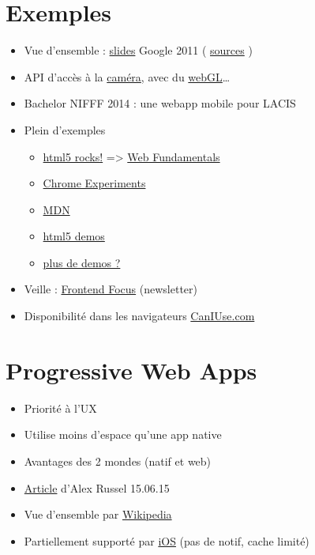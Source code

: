 \hypertarget{exemples}{%
\section{Exemples}\label{exemples}}

\begin{itemize}
\tightlist
\item
  Vue d'ensemble :
  \href{http://web.archive.org/web/20150525080904/http://slides.html5rocks.com/\#landing-slide}{slides}
  Google 2011 (
  \href{https://github.com/html5rocks/slides.html5rocks.com}{sources} )
\item
  API d'accès à la
  \href{http://www.soundstep.com/blog/experiments/jsdetection/}{caméra},
  avec du
  \href{http://auduno.github.io/clmtrackr/examples/facesubstitution.html}{webGL}\ldots{}
\item
  Bachelor NIFFF 2014 : une webapp mobile pour LACIS
\item
  Plein d'exemples

  \begin{itemize}
  \tightlist
  \item
    \href{http://www.html5rocks.com/}{html5 rocks!} =\textgreater{}
    \href{https://developers.google.com/web/}{Web Fundamentals}
  \item
    \href{http://www.chromeexperiments.com/}{Chrome Experiments}
  \item
    \href{https://developer.mozilla.org/en-US/demos/tag/tech:html5}{MDN}
  \item
    \href{http://html5demos.com/}{html5 demos}
  \item
    \href{http://bit.ly/VJaqjb}{plus de demos ?}
  \end{itemize}
\item
  Veille : \href{http://html5weekly.com/}{Frontend Focus} (newsletter)
\item
  Disponibilité dans les navigateurs
  \href{https://caniuse.com/}{CanIUse.com}
\end{itemize}

\hypertarget{progressive-web-apps}{%
\section{Progressive Web Apps}\label{progressive-web-apps}}

\begin{itemize}
\tightlist
\item
  Priorité à l'UX
\item
  Utilise moins d'espace qu'une app native
\item
  Avantages des 2 mondes (natif et web)
\item
  \href{https://infrequently.org/2015/06/progressive-apps-escaping-tabs-without-losing-our-soul/}{Article}
  d'Alex Russel 15.06.15
\item
  Vue d'ensemble par
  \href{https://en.wikipedia.org/wiki/Progressive_web_app}{Wikipedia}
\item
  Partiellement supporté par \href{https://love2dev.com/pwa/ios/}{iOS}
  (pas de notif, cache limité)
\end{itemize}

